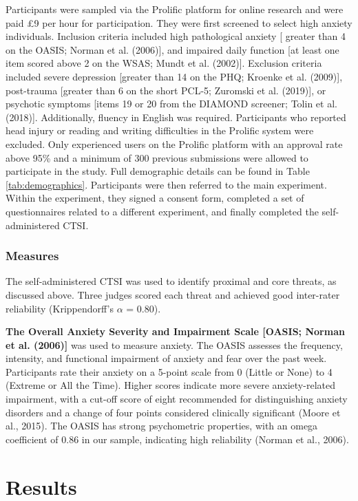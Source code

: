 \documentclass[
  man,floatsintext]{apa7}
\begin{document}
Participants were sampled via the Prolific platform for online research and were paid £9 per hour for participation.
They were first screened to select high anxiety individuals.
Inclusion criteria included high pathological anxiety {[} greater than 4 on the OASIS; Norman et al. (2006){]},
and impaired daily function {[}at least one item scored above 2 on the WSAS; Mundt et al. (2002){]}.
Exclusion criteria included severe depression {[}greater than 14 on the PHQ; Kroenke et al. (2009){]}, post-trauma {[}greater than 6 on the short PCL-5; Zuromski et al. (2019){]}, or psychotic symptoms {[}items 19 or 20 from the DIAMOND screener; Tolin et al. (2018){]}.
Additionally, fluency in English was required.
Participants who reported head injury or reading and writing difficulties in the Prolific system were excluded.
Only experienced users on the Prolific platform with an approval rate above 95\% and a minimum of 300 previous submissions were allowed to participate in the study.
Full demographic details can be found in Table \ref{tab:demographics}.
Participants were then referred to the main experiment.
Within the experiment, they signed a consent form, completed a set of questionnaires related to a different experiment, and finally completed the self-administered CTSI.

\subsubsection{Measures}\label{measures-4}

The self-administered CTSI was used to identify proximal and core threats, as discussed above.
Three judges scored each threat and achieved good inter-rater reliability (Krippendorff's \(\alpha\) = 0.80).

\textbf{The Overall Anxiety Severity and Impairment Scale {[}OASIS; Norman et al. (2006){]}} was used to measure anxiety.
The OASIS assesses the frequency, intensity, and functional impairment of anxiety and fear over the past week.
Participants rate their anxiety on a 5-point scale from 0 (Little or None) to 4 (Extreme or All the Time).
Higher scores indicate more severe anxiety-related impairment, with a cut-off score of eight recommended for distinguishing anxiety disorders and a change of four points considered clinically significant (Moore et al., 2015).
The OASIS has strong psychometric properties, with an omega coefficient of 0.86 in our sample, indicating high reliability (Norman et al., 2006).

\section{Results}\label{results}
\end{document}
